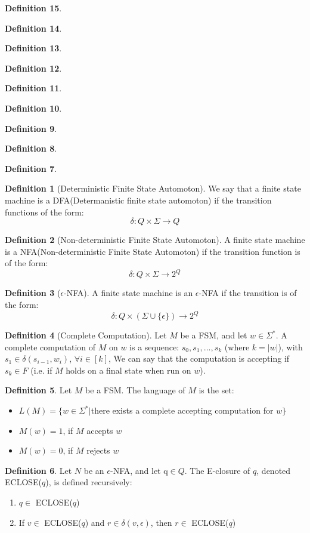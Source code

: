 \documentclass{article}
\theoremstyle{definition}
\newtheorem{define}{Definition}[section]
\begin{document}
\begin{define}
\begin{define}
\begin{define}
\begin{define}
\begin{define}
\begin{define}
\begin{define}
\begin{define}
\begin{define}
\begin{define}[Deterministic Finite State Automoton]
We say that a finite state machine is a DFA(Determanistic finite state automoton) if the transition functions of the form: $$\delta: Q \times \Sigma \rightarrow Q$$
\end{define}

\begin{define}[Non-deterministic Finite State Automoton]
A finite state machine is a NFA(Non-deterministic Finite State Automoton) if the transition function is of the form: $$\delta: Q\times \Sigma \rightarrow 2^Q$$
\end{define}

\begin{define}[$\epsilon$-NFA]
A finite state machine is an $\epsilon$-NFA if the transition is of the form: $$\delta: Q \times (\Sigma \cup \{\epsilon\}) \rightarrow 2^Q$$
\end{define}

\begin{define}[Complete Computation]
Let $M$ be a FSM, and let $w \in \Sigma^*$. A complete computation of $M$ on $w$ is a sequence: $s_0, s_1,...,s_k$ (where $k=|w|$), with $s_1\in \delta(s_{i-1},w_i)$, $\forall i\in [k]$, We can say that the computation is accepting if $s_k \in F$ (i.e. if $M$ holds on a final state when run on $w$).
\end{define}

\begin{define}
Let $M$ be a FSM. The language of $M$ is the set:
	\begin{itemize}
		\item $L(M)=\{w\in \Sigma^*| $there exists a complete accepting computation for $w\}$
		\item $M(w)=1$, if $M$ accepts $w$
		\item $M(w)=0$, if $M$ rejects $w$
	\end{itemize}
\end{define}

\begin{define}
Let $N$ be an $\epsilon$-NFA, and let q$ \in Q$. The  E-closure of $q$, denoted ECLOSE($q$), is defined recursively: 
	\begin{enumerate}
		\item $q \in$  ECLOSE($q$)
		\item If $v \in$ ECLOSE($q$) and  $r \in \delta(v,\epsilon)$, then $r\in$ ECLOSE($q$)
	\end{enumerate}
\end{define}


\end{define}
\end{define}
\end{define}
\end{define}
\end{define}
\end{define}
\end{define}
\end{define}
\end{define}
\end{document}
